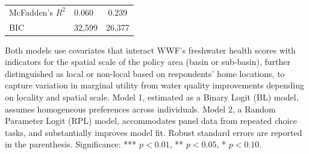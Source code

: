 \begin{center}
{\begin{table}[H]
{\begin{tabular}{p{6cm}p{3cm}p{2cm}p{2cm}}
    McFadden's $R^2$ & \multicolumn{1}{l}{0.060} & \multicolumn{2}{c}{0.239}\\


    BIC & \multicolumn{1}{l}{32,599} & \multicolumn{2}{c}{26,377}\\
    
   \midrule
\end{tabular}
}
\vspace{0.2em}

\small
Both models use covariates that interact WWF’s freshwater health scores with indicators for the spatial 
scale of the policy area (basin or sub-basin), further distinguished as local or non-local based on 
respondents’ home locations, to capture variation in marginal utility from water quality improvements 
depending on locality and spatial scale. Model 1, estimated as a Binary Logit (BL) model, assumes 
homogeneous preferences across individuals. Model 2, a Random Parameter Logit (RPL) model, accommodates panel data from repeated 
choice tasks, and substantially improves model fit. Robust standard errors are reported in the parenthesis. 
Significance: *** $p < 0.01$, ** $p < 0.05$, * $p < 0.10$.


\end{table}

}
\end{center}